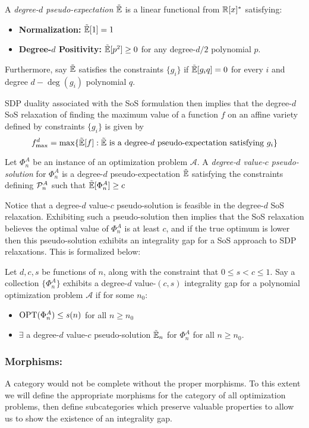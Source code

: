 \documentclass[runningheads,a4paper,english]{llncs}[2022/01/12]
\begin{document}
\begin{definition}
  A \emph{degree-$d$ pseudo-expectation} $\tilde{\mathbb{E}}$ is a linear functional from $\mathbb{R}[x]^*$ satisfying:
  \begin{itemize}
    \item \textbf{Normalization:} $\tilde{\mathbb{E}}[1] = 1$
    \item \textbf{Degree-$d$ Positivity:} $\tilde{\mathbb{E}}[p^2] \ge 0$ for any degree-$d/2$ polynomial $p$.
  \end{itemize}
  Furthermore, say $\tilde{\mathbb{E}}$ satisfies the constraints $\{g_i\}$ if $\tilde{\mathbb{E}}[g_iq] = 0$ for every $i$ and degree $d-\deg(g_i)$ polynomial $q$.
\end{definition}
SDP duality associated with the SoS formulation then implies that the degree-$d$ SoS relaxation of finding the maximum value of a function $f$ on an affine variety defined by constraints $\{g_i\}$ is given by
\[f_{\max}^d = \max\{\tilde{\mathbb{E}}[f] : \tilde{\mathbb{E}} \text{ is a degree-$d$ pseudo-expectation satisfying } g_i\}\]
\begin{definition}
  Let $\Phi_n^A$ be an instance of an optimization problem $\mathscr{A}$.
  A \emph{degree-$d$ value-$c$ pseudo-solution} for $\Phi_n^A$ is a degree-$d$ pseudo-expectation $\tilde{\mathbb{E}}$ satisfying the constraints defining $\mathcal{P}_n^A$ such that $\tilde{\mathbb{E}}[\Phi_n^A] \ge c$
\end{definition}
Notice that a degree-$d$ value-$c$ pseudo-solution is feasible in the degree-$d$ SoS relaxation.
Exhibiting such a pseudo-solution then implies that the SoS relaxation believes the optimal value of $\Phi_n^A$ is at least $c$, and if the true optimum is lower then this pseudo-solution exhibits an integrality gap for a SoS approach to SDP relaxations.
This is formalized below:
\begin{definition}
  Let $d, c, s$ be functions of $n$, along with the constraint that $0\le s < c \le 1$. Say a collection $\{\Phi_n^A\}$ exhibits a degree-$d$ value-$(c,s)$ integrality gap for a polynomial optimization problem $\mathscr{A}$ if for some $n_0$:
  \begin{itemize}
    \item $\operatorname{OPT}(\Phi_n^A) \le s(n)$ for all $n \ge n_0$
    \item $\exists$ a degree-$d$ value-$c$ pseudo-solution $\tilde{\mathbb{E}}_n$ for $\Phi_n^A$ for all $n\ge n_0$.
  \end{itemize}
\end{definition}

\subsubsection{Morphisms:}
A category would not be complete without the proper morphisms.
To this extent we will define the appropriate morphisms for the category of all optimization problems, then define subcategories which preserve valuable properties to allow us to show the existence of an integrality gap.
\end{document}
